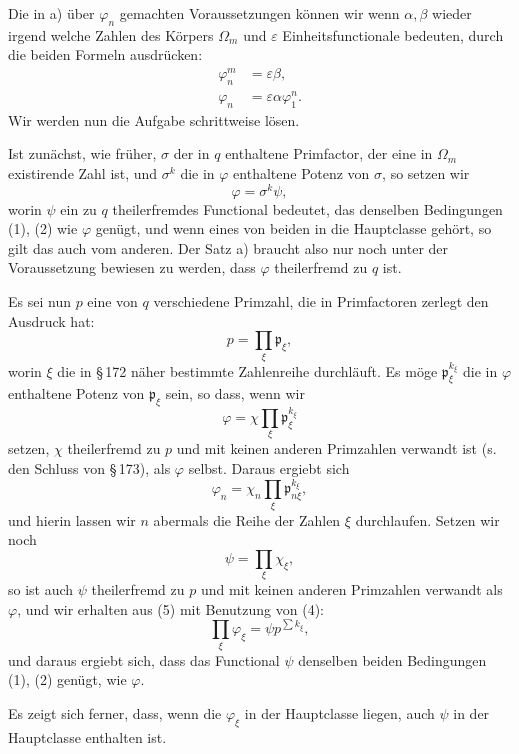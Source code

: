 \documentclass[11pt]{article}
\newcommand{\frp}{\mathfrak p}
\begin{document}
Die in a) über $\varphi_n$ gemachten Voraussetzungen können wir wenn $\alpha,\beta$ wieder irgend welche Zahlen des Körpers $\Omega_m$ und $\varepsilon$ Einheitsfunctionale bedeuten, durch die beiden Formeln ausdrücken:
\begin{align}
\varphi_n^m&=\varepsilon\beta, \tag{1}\\
\varphi_n&=\varepsilon\alpha\varphi_1^n. \tag{2}
\end{align}
Wir werden nun die Aufgabe schrittweise lösen.

Ist zunächst, wie früher, $\sigma$ der in $q$ enthaltene Primfactor, der eine in $\Omega_m$ existirende Zahl ist, und $\sigma^k$ die in $\varphi$ enthaltene Potenz von $\sigma$, so setzen wir
\begin{equation}
\varphi=\sigma^k\psi,
\tag{3}
\end{equation}
worin $\psi$ ein zu $q$ theilerfremdes Functional bedeutet, das denselben Bedingungen (1), (2) wie $\varphi$ genügt, und wenn eines von beiden in die Hauptclasse gehört, so gilt das auch vom anderen. Der Satz a) braucht also nur noch unter der Voraussetzung bewiesen zu werden, dass $\varphi$ theilerfremd zu $q$ ist.

Es sei nun $p$ eine von $q$ verschiedene Primzahl, die in Primfactoren zerlegt den Ausdruck hat:
\begin{equation}
p=\prod_\xi \frp_\xi,
\tag{4}
\end{equation}
worin $\xi$ die in \S\,172 näher bestimmte Zahlenreihe durchläuft. Es möge $\frp_\xi^{k_\xi}$ die in $\varphi$ enthaltene Potenz von $\frp_\xi$ sein, so dass, wenn wir
\[
\varphi=\chi\prod_\xi \frp_\xi^{k_\xi}
\]
setzen, $\chi$ theilerfremd zu $p$ und mit keinen anderen Primzahlen verwandt ist (s. den Schluss von \S\,173), als $\varphi$ selbst. Daraus ergiebt sich
\begin{equation}
\varphi_n=\chi_n\prod_\xi \frp_{n\xi}^{k_\xi},
\tag{5}
\end{equation}
und hierin lassen wir $n$ abermals die Reihe der Zahlen $\xi$ durchlaufen. Setzen wir noch
\[
\psi=\prod_\xi \chi_\xi,
\]
so ist auch $\psi$ theilerfremd zu $p$ und mit keinen anderen Primzahlen verwandt als $\varphi$, und wir erhalten aus (5) mit Benutzung von (4):
\begin{equation}
\prod_\xi\varphi_\xi=\psi p^{\sum k_\xi},
\tag{6}
\end{equation}
und daraus ergiebt sich, dass das Functional $\psi$ denselben beiden Bedingungen (1), (2) genügt, wie $\varphi$.

Es zeigt sich ferner, dass, wenn die $\varphi_\xi$ in der Hauptclasse liegen, auch $\psi$ in der Hauptclasse enthalten ist.
\end{document}
